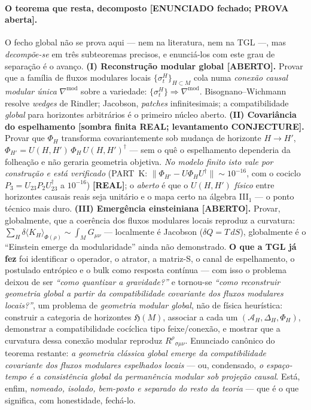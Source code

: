 \documentclass[12pt,a4paper]{article}
\newcommand{\TGL}{\textsc{TGL}}
\begin{document}
\paragraph{O teorema que resta, decomposto \textbf{[ENUNCIADO fechado; PROVA aberta]}.} O fecho global não se prova aqui --- nem na literatura, nem na \TGL{} ---, mas \emph{decompõe-se} em três subteoremas precisos, e enunciá-los com este grau de separação é o avanço. \textbf{(I) Reconstrução modular global [ABERTO].} Provar que a família de fluxos modulares locais $\{\sigma_t^H\}_{H\subset M}$ cola numa \emph{conexão causal modular única} $\nabla^{\mathrm{mod}}$ sobre a variedade: $\{\sigma_t^H\}\Rightarrow\nabla^{\mathrm{mod}}$. Bisognano--Wichmann resolve \emph{wedges} de Rindler; Jacobson, \emph{patches} infinitesimais; a compatibilidade \emph{global} para horizontes arbitrários é o primeiro núcleo aberto. \textbf{(II) Covariância do espelhamento [sombra finita REAL; levantamento CONJECTURE].} Provar que $\Phi_H$ transforma covariantemente sob mudança de horizonte $H\to H'$, $\Phi_{H'}=U(H,H')\,\Phi_H\,U(H,H')^\dagger$ --- sem o quê o espelhamento dependeria da folheação e não geraria geometria objetiva. \emph{No modelo finito isto vale por construção e está verificado} (PART~K: $\lVert\Phi_{H'}-U\Phi_H U^\dagger\rVert\sim10^{-16}$, com o cociclo $P_3=U_{23}P_2U_{23}^\dagger$ a $10^{-16}$) \textbf{[REAL]}; o \emph{aberto} é que o $U(H,H')$ \emph{físico} entre horizontes causais reais seja unitário e o mapa certo na álgebra III$_1$ --- o ponto técnico mais duro. \textbf{(III) Emergência einsteiniana [ABERTO].} Provar, globalmente, que a coerência dos fluxos modulares locais reproduz a curvatura: $\sum_H\delta\langle K_H\rangle_{\Phi(\rho)}\sim\int_M G_{\mu\nu}$ --- localmente é Jacobson ($\delta Q=T\,dS$), globalmente é o ``Einstein emerge da modularidade'' ainda não demonstrado. \textbf{O que a \TGL{} já fez} foi identificar o operador, o atrator, a matriz-S, o canal de espelhamento, o postulado entrópico e o bulk como resposta contínua --- com isso o problema deixou de ser \emph{``como quantizar a gravidade?''} e tornou-se \emph{``como reconstruir geometria global a partir da compatibilidade covariante dos fluxos modulares locais?''}, um problema de \emph{geometria modular global}, não de física heurística: construir a categoria de horizontes $\mathfrak H(M)$, associar a cada um $(\mathcal A_H,\Delta_H,\Phi_H)$, demonstrar a compatibilidade cocíclica tipo feixe/conexão, e mostrar que a curvatura dessa conexão modular reproduz $R^\rho{}_{\sigma\mu\nu}$. Enunciado canônico do teorema restante: \emph{a geometria clássica global emerge da compatibilidade covariante dos fluxos modulares espelhados locais} --- ou, condensado, \emph{o espaço-tempo é a consistência global da permanência modular sob projeção causal}. Está, enfim, \emph{nomeado, isolado, bem-posto e separado do resto da teoria} --- que é o que significa, com honestidade, fechá-lo.
\end{document}
